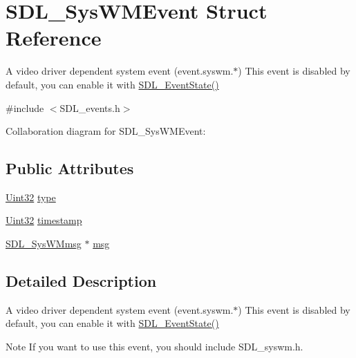 \hypertarget{struct_s_d_l___sys_w_m_event}{\section{S\-D\-L\-\_\-\-Sys\-W\-M\-Event Struct Reference}
\label{struct_s_d_l___sys_w_m_event}
}


A video driver dependent system event (event.\-syswm.$\ast$) This event is disabled by default, you can enable it with \hyperlink{_s_d_l__events_8h_afb772893e1c46f186fa39a4defe76df3}{S\-D\-L\-\_\-\-Event\-State()}  




{\ttfamily \#include $<$S\-D\-L\-\_\-events.\-h$>$}



Collaboration diagram for S\-D\-L\-\_\-\-Sys\-W\-M\-Event\-:
\subsection*{Public Attributes}
\begin{DoxyCompactItemize}
\item 
\hyperlink{_s_d_l__stdinc_8h_add440eff171ea5f55cb00c4a9ab8672d}{Uint32} \hyperlink{struct_s_d_l___sys_w_m_event_a84697e96cb16bf6a570e10b5bfdcd392}{type}
\item 
\hyperlink{_s_d_l__stdinc_8h_add440eff171ea5f55cb00c4a9ab8672d}{Uint32} \hyperlink{struct_s_d_l___sys_w_m_event_a5d3cb97006d99b620c2671c27bd82c06}{timestamp}
\item 
\hyperlink{struct_s_d_l___sys_w_mmsg}{S\-D\-L\-\_\-\-Sys\-W\-Mmsg} $\ast$ \hyperlink{struct_s_d_l___sys_w_m_event_ad5e3dc68aa15582cd0641847d41c74e8}{msg}
\end{DoxyCompactItemize}


\subsection{Detailed Description}
A video driver dependent system event (event.\-syswm.$\ast$) This event is disabled by default, you can enable it with \hyperlink{_s_d_l__events_8h_afb772893e1c46f186fa39a4defe76df3}{S\-D\-L\-\_\-\-Event\-State()} 

\begin{DoxyNote}{Note}
If you want to use this event, you should include S\-D\-L\-\_\-syswm.\-h. 
\end{DoxyNote}


